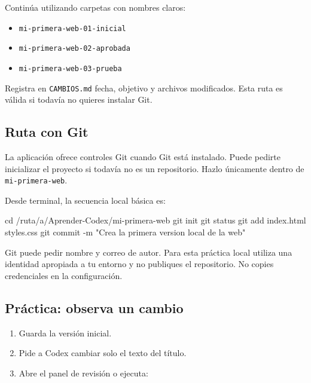 \documentclass[10pt,a4paper,openany]{book}
\providecommand{\tightlist}{\setlength{\itemsep}{0.18em}\setlength{\parskip}{0pt}}
\newenvironment{Shaded}{}{}
\newcommand{\AttributeTok}[1]{\textcolor[rgb]{0.49,0.56,0.16}{#1}}
\newcommand{\BuiltInTok}[1]{\textcolor[rgb]{0.00,0.50,0.00}{#1}}
\newcommand{\FunctionTok}[1]{\textcolor[rgb]{0.02,0.16,0.49}{#1}}
\newcommand{\NormalTok}[1]{#1}
\newcommand{\StringTok}[1]{\textcolor[rgb]{0.25,0.44,0.63}{#1}}
\renewenvironment{Shaded}
  {\begin{tcolorbox}[
    enhanced,
    breakable,
    colback=CodeBg,
    colframe=Border,
    boxrule=0.5pt,
    arc=2mm,
    left=3mm,
    right=3mm,
    top=2.2mm,
    bottom=2.2mm,
    before skip=0.8em,
    after skip=0.9em
  ]}
  {\end{tcolorbox}}
\begin{document}
Continúa utilizando carpetas con nombres claros:

\begin{itemize}
\tightlist
\item
  \texttt{mi-primera-web-01-inicial}
\item
  \texttt{mi-primera-web-02-aprobada}
\item
  \texttt{mi-primera-web-03-prueba}
\end{itemize}

Registra en \texttt{CAMBIOS.md} fecha, objetivo y archivos modificados.
Esta ruta es válida si todavía no quieres instalar Git.

\subsection{Ruta con Git}\label{ruta-con-git}

La aplicación ofrece controles Git cuando Git está instalado. Puede
pedirte inicializar el proyecto si todavía no es un repositorio. Hazlo
únicamente dentro de \texttt{mi-primera-web}.

Desde terminal, la secuencia local básica es:

\begin{Shaded}
\begin{Highlighting}[]
\BuiltInTok{cd}\NormalTok{ /ruta/a/Aprender{-}Codex/mi{-}primera{-}web}
\FunctionTok{git}\NormalTok{ init}
\FunctionTok{git}\NormalTok{ status}
\FunctionTok{git}\NormalTok{ add index.html styles.css}
\FunctionTok{git}\NormalTok{ commit }\AttributeTok{{-}m} \StringTok{"Crea la primera version local de la web"}
\end{Highlighting}
\end{Shaded}

Git puede pedir nombre y correo de autor. Para esta práctica local
utiliza una identidad apropiada a tu entorno y no publiques el
repositorio. No copies credenciales en la configuración.

\subsection{Práctica: observa un
cambio}\label{pruxe1ctica-observa-un-cambio}

\begin{enumerate}
\def\labelenumi{\arabic{enumi}.}
\tightlist
\item
  Guarda la versión inicial.
\item
  Pide a Codex cambiar solo el texto del título.
\item
  Abre el panel de revisión o ejecuta:
\end{enumerate}
\end{document}

